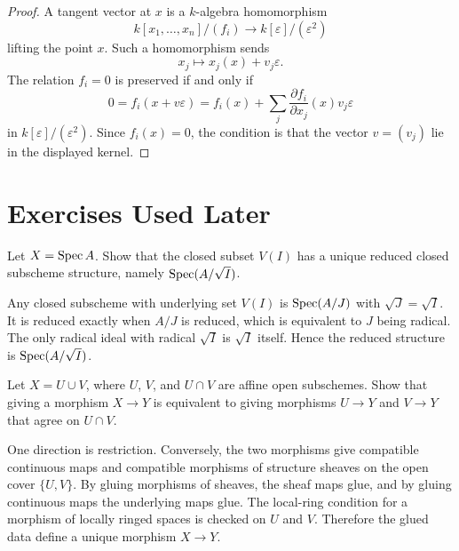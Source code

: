 \begin{proof}
A tangent vector at \(x\) is a \(k\)-algebra homomorphism
\[
    k[x_1,\ldots,x_n]/(f_i)\longrightarrow k[\varepsilon]/(\varepsilon^2)
\]
lifting the point \(x\).  Such a homomorphism sends
\[
    x_j\longmapsto x_j(x)+v_j\varepsilon.
\]
The relation \(f_i=0\) is preserved if and only if
\[
    0=f_i(x+v\varepsilon)
    =
    f_i(x)+\sum_j \frac{\partial f_i}{\partial x_j}(x)v_j\varepsilon
\]
in \(k[\varepsilon]/(\varepsilon^2)\).  Since \(f_i(x)=0\), the condition is
that the vector \(v=(v_j)\) lie in the displayed kernel.
\end{proof}

\section{Exercises Used Later}

\begin{exercise}\label{ex:reduced-closed}
Let \(X=\operatorname{Spec} A\).  Show that the closed subset \(V(I)\) has a unique reduced
closed subscheme structure, namely \(\operatorname{Spec}(A/\sqrt I)\).
\end{exercise}

\begin{solution}
Any closed subscheme with underlying set \(V(I)\) is \(\operatorname{Spec}(A/J)\) with
\(\sqrt J=\sqrt I\).  It is reduced exactly when \(A/J\) is reduced, which is
equivalent to \(J\) being radical.  The only radical ideal with radical
\(\sqrt I\) is \(\sqrt I\) itself.  Hence the reduced structure is
\(\operatorname{Spec}(A/\sqrt I)\).
\end{solution}

\begin{exercise}\label{ex:affine-gluing-test}
Let \(X=U\cup V\), where \(U\), \(V\), and \(U\cap V\) are affine open
subschemes.  Show that giving a morphism \(X\to Y\) is equivalent to giving
morphisms \(U\to Y\) and \(V\to Y\) that agree on \(U\cap V\).
\end{exercise}

\begin{solution}
One direction is restriction.  Conversely, the two morphisms give compatible
continuous maps and compatible morphisms of structure sheaves on the open cover
\(\{U,V\}\).  By gluing morphisms of sheaves, the sheaf maps glue, and by
gluing continuous maps the underlying maps glue.  The local-ring condition for
a morphism of locally ringed spaces is checked on \(U\) and \(V\).  Therefore
the glued data define a unique morphism \(X\to Y\).
\end{solution}

